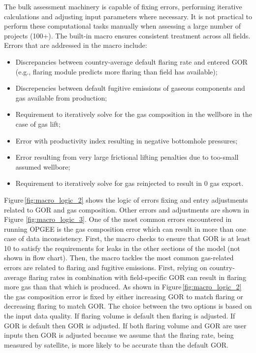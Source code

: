 \documentclass[11pt]{report}
\begin{document}
{{{{The bulk assessment machinery is capable of fixing errors, performing iterative calculations and adjusting input parameters where necessary. It is not practical to perform these computational tasks manually when assessing a large number of projects (100+). The built-in macro ensures consistent treatment across all fields. Errors that are addressed in the macro include:
\begin{itemize}
\item Discrepancies between country-average default flaring rate and entered GOR (e.g., flaring module predicts more flaring than field has available);
\item Discrepencies between default fugitive emissions of gaseous components and gas available from production;
\item Requirement to iteratively solve for the gas composition in the wellbore in the case of gas lift;
\item Error with productivity index resulting in negative bottomhole pressures;
\item Error resulting from very large frictional lifting penalties due to too-small assumed wellbore;
\item Requirement to iteratively solve for gas reinjected to result in 0 gas export.
\end{itemize}

Figure\,\ref{fig:macro_logic_2} shows the logic of errors fixing and entry adjustments related to GOR and gas composition. Other errors and adjustments are shown in Figure \ref{fig:macro_logic_3}. One of the most common errors encountered in running OPGEE is the gas composition error which can result in more than one case of data inconsistency. First, the macro checks to ensure that GOR is at least 10 to satisfy the requirements for leaks in the other sections of the model (not shown in flow chart). Then, the macro tackles the most common gas-related errors are related to flaring and fugitive emissions. First, relying on country-average flaring rates in combination with field-specific GOR can result in flaring more gas than that which is produced. As shown in Figure\,\ref{fig:macro_logic_2} the gas composition error is fixed by either increasing GOR to match flaring or decreasing flaring to match GOR. The choice between the two options is based on the input data quality. If flaring volume is default then flaring is adjusted. If GOR is default then GOR is adjusted. If both flaring volume and GOR are user inputs then GOR is adjusted because we assume that the flaring rate, being measured by satellite, is more likely to be accurate than the default GOR.

}}}}
\end{document}
